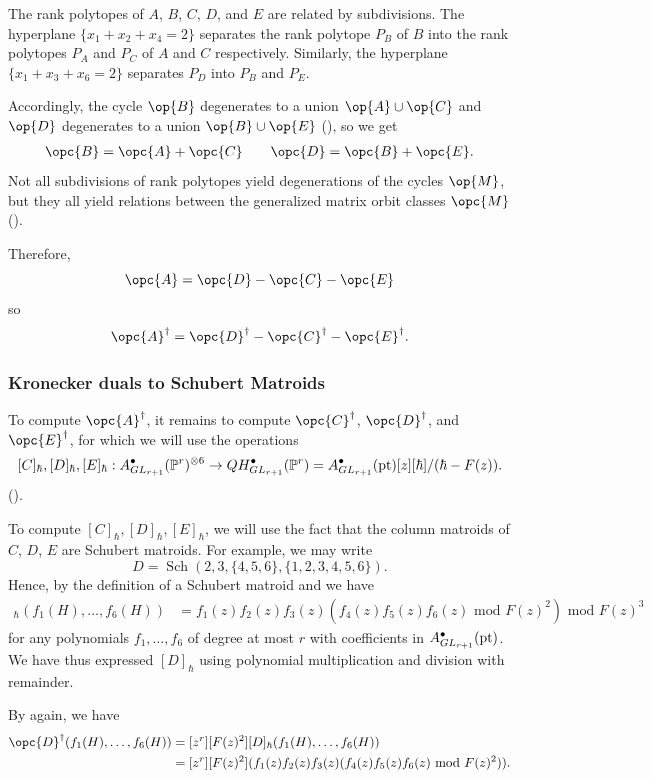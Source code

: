 \documentclass[12pt]{amsart}
\newcommand{\mb}{\mathbb}
\newcommand{\pt}{{\rm pt}}
\theoremstyle{plain}
\theoremstyle{definition}
\theoremstyle{remark}
\begin{document}
The rank polytopes of $A$, $B$, $C$, $D$, and $E$ are related by subdivisions. The hyperplane $\{x_1+x_2+x_{4}=2\}$ separates the rank polytope $P_B$ of $B$ into the rank polytopes $P_A$ and $P_C$ of $A$ and $C$ respectively. Similarly, the hyperplane $\{x_1+x_3+x_6=2\}$ separates $P_D$ into $P_B$ and $P_E$.

Accordingly, the cycle $\op{B}$ degenerates to a union $\op{A}\cup \op{C}$ and $\op{D}$ degenerates to a union $\op{B}\cup \op{E}$ (), so we get 
\begin{align*}
\opc{B}=\opc{A}+\opc{C} \qquad \opc{D}=\opc{B}+\opc{E}.
\end{align*}
Not all subdivisions of rank polytopes yield degenerations of the cycles $\op{M}$, but they all yield relations between the generalized matrix orbit classes $\opc{M}$ ().

Therefore, 
\[
\opc{A}=\opc{D}-\opc{C}-\opc{E}
\] so 
\[
\opc{A}^\dagger=\opc{D}^\dagger-\opc{C}^\dagger-\opc{E}^\dagger.
\]

\subsubsection{Kronecker duals to Schubert Matroids}
\label{Schubertexample}
To compute $\opc{A}^{\dagger}$, it remains to compute $\opc{C}^{\dagger}$, $\opc{D}^{\dagger}$, and $\opc{E}^{\dagger}$, for which we will use the operations 
\[[C]_\hbar, [D]_\hbar, [E]_\hbar : A^\bullet_{GL_{r+1}}(\mb{P}^r)^{\otimes 6} \to QH^\bullet_{GL_{r+1}}(\mb{P}^r) = A^\bullet_{GL_{r+1}}(\pt)[z][\hbar]/(\hbar-F(z)).\]
(). 

To compute $[C]_\hbar, [D]_\hbar, [E]_\hbar$, we will use the fact that the column matroids of $C$, $D$, $E$ are Schubert matroids. For example, we may write \[D = \operatorname{Sch}(2,3,\{4,5,6\},\{1,2,3,4,5,6\}).\] Hence, by the definition of a Schubert matroid and  we have 
\begin{align*}
[D]_\hbar(f_1(H), \ldots, f_{6}(H)) &= f_1(z)f_2(z)f_3(z) (f_4(z) f_{5}(z) f_{6}(z)\text{ mod }F(z)^2)\text{ mod }F(z)^3
\end{align*}
for any polynomials $f_1, \ldots, f_{6}$ of degree at most $r$ with coefficients in $A^\bullet_{GL_{r+1}}(\pt)$. We have thus expressed $[D]_\hbar$ using polynomial multiplication and division with remainder.

By  again, we have
\begin{align*}
\opc{D}^{\dagger}(f_1(H), \ldots, f_{6}(H)) &= [z^r][F(z)^2][D]_\hbar(f_1(H), \ldots, f_{6}(H)) \\
&= [z^r][F(z)^2](f_1(z)f_2(z)f_3(z) (f_4(z) f_{5}(z) f_{6}(z)\text{ mod }F(z)^2)).
\end{align*}
\end{document}
